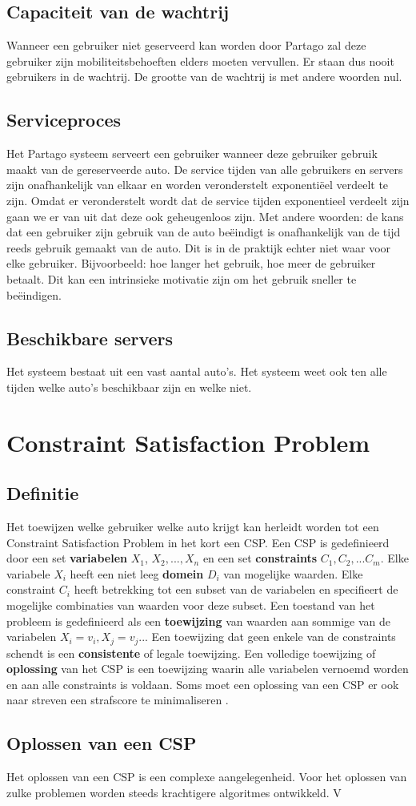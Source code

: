 \subsection{Capaciteit van de wachtrij}
Wanneer een gebruiker niet geserveerd kan worden door Partago zal deze gebruiker zijn mobiliteitsbehoeften elders moeten vervullen. Er staan dus nooit gebruikers in de wachtrij. De grootte van de wachtrij is met andere woorden nul.

\subsection{Serviceproces}
Het Partago systeem serveert een gebruiker wanneer deze gebruiker gebruik maakt van de gereserveerde auto. De service tijden van alle gebruikers en servers zijn onafhankelijk van elkaar en worden veronderstelt exponentiëel verdeelt te zijn. Omdat er veronderstelt wordt dat de service tijden exponentieel verdeelt zijn gaan we er van uit dat deze ook geheugenloos zijn. Met andere woorden: de kans dat een gebruiker zijn gebruik van de auto beëindigt is onafhankelijk van de tijd reeds gebruik gemaakt van de auto. Dit is in de praktijk echter niet waar voor elke gebruiker. Bijvoorbeeld: hoe langer het gebruik, hoe meer de gebruiker betaalt. Dit kan een intrinsieke motivatie zijn om het gebruik sneller te beëindigen.

\subsection{Beschikbare servers}
Het systeem bestaat uit een vast aantal auto's. Het systeem weet ook ten alle tijden welke auto's beschikbaar zijn en welke niet.


\section{Constraint Satisfaction Problem}

\subsection{Definitie}
Het toewijzen welke gebruiker welke auto krijgt kan herleidt worden tot een Constraint Satisfaction Problem in het kort een CSP. Een CSP is gedefinieerd door een set \textbf{variabelen} $X_{1}$, $X_{2},...,X_{n}$ en een set \textbf{constraints} $C_{1}, C_{2},...C_{m}$. Elke variabele $X_{i}$ heeft een niet leeg \textbf{domein} $D_{i}$ van mogelijke waarden. Elke constraint $C_{i}$ heeft betrekking tot een subset van de variabelen en specifieert de mogelijke combinaties van waarden voor deze subset. Een toestand van het probleem is gedefinieerd als een \textbf{toewijzing} van waarden aan sommige van de variabelen $X_{i} =  v_{i}, X_{j} = v_{j}$... Een toewijzing dat geen enkele van de constraints schendt is een \textbf{consistente} of legale toewijzing. Een volledige toewijzing of \textbf{oplossing} van het CSP is een toewijzing waarin alle variabelen vernoemd worden en aan alle constraints is voldaan. Soms moet een oplossing van een CSP er ook naar streven een strafscore te minimaliseren \autocite{norvig}.

\subsection{Oplossen van een CSP}
Het oplossen van een CSP is een complexe aangelegenheid. Voor het oplossen van zulke problemen worden steeds krachtigere algoritmes ontwikkeld. V